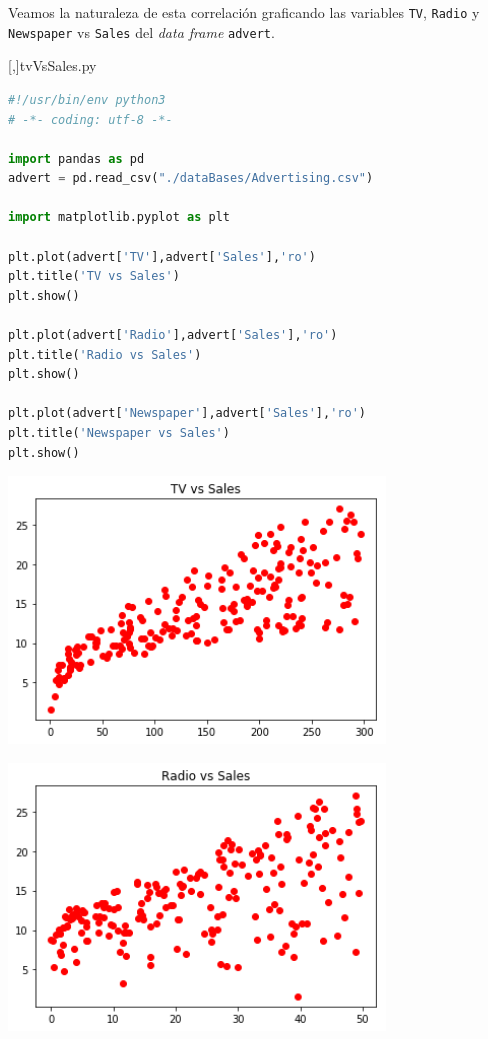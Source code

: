 Veamos la naturaleza de esta correlación graficando las variables \texttt{TV}, \texttt{Radio} y \texttt{Newspaper} vs \texttt{Sales} del \textit{data frame} \texttt{advert}.

[,]{tvVsSales.py}
\begin{lstlisting}[language=Python]
#!/usr/bin/env python3
# -*- coding: utf-8 -*-

import pandas as pd
advert = pd.read_csv("./dataBases/Advertising.csv")

import matplotlib.pyplot as plt

plt.plot(advert['TV'],advert['Sales'],'ro')
plt.title('TV vs Sales')
plt.show()

plt.plot(advert['Radio'],advert['Sales'],'ro')
plt.title('Radio vs Sales')
plt.show()

plt.plot(advert['Newspaper'],advert['Sales'],'ro')
plt.title('Newspaper vs Sales')
plt.show()
\end{lstlisting}


\begin{center}
 \includegraphics[width=10cm,keepaspectratio=true]{./images/tvVsSales.png}
\end{center}


\begin{center}
 \includegraphics[width=10cm,keepaspectratio=true]{./images/radioVsSales.png}
\end{center}


